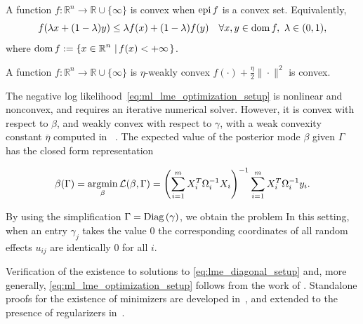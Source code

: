 \begin{definition}[Convexity]
A function $f:\mathbb{R}^n\rightarrow \mathbb{R} \cup \{\infty\}$ is convex when $\operatorname{epi} f$ is a convex set. Equivalently, 
\[
f(\lambda x + (1-\lambda)y) \leq \lambda f(x) + (1-\lambda) f(y) \quad \forall x,y\in\operatorname{\mathrm{dom}}{f},\ \lambda \in (0,1),
\]
where $\operatorname{\mathrm{dom}}{f}:=\left\{x\in{\operatorname{\mathbb{R}}^n}\,\left|\,f(x)<+\infty\right.\right\}$.
\end{definition}

\begin{definition}
A function $f:\mathbb{R}^n\rightarrow \mathbb{R} \cup \{\infty\}$ is $\eta$-weakly convex 
$f(\cdot)+\frac{\eta}{2}\|\cdot\|^2$ is convex. 
\end{definition}

The negative log likelihood~\eqref{eq:ml_lme_optimization_setup}  is nonlinear and nonconvex, and requires an iterative numerical solver.
However, it is convex with respect to $\beta$, and weakly convex with respect to $\gamma$, with a weak convexity constant $\overline \eta$
computed in~\cite[Section 5.1]{Theory1} . The expected value of the posterior mode $\beta$ given $\Gamma$ has the closed form representation 
	
\begin{equation}
	\label{eq:beta_formula}
	\beta(\Gamma) = \operatorname*{\mathrm{argmin}}_{\beta}\operatorname{\mathcal{L}}(\beta, \Gamma) = \left(\sum_{i = 1}^m X_i^T\Omega_i^{-1}X_i\right)^{-1}\sum_{i = 1}^mX_i^T\Omega_i^{-1}y_i.
\end{equation}

By using the simplification $\Gamma=\mathrm{Diag}\left(\gamma\right)$, we obtain the problem
In this setting, when an
entry $\gamma_j$ takes the  value $0$ the corresponding coordinates of all random effects $u_{ij}$ are identically $0$ for all $i$. 

Verification of the existence to solutions to \eqref{eq:lme_diagonal_setup}
and, more generally, \eqref{eq:ml_lme_optimization_setup} follows from the work of \cite{zheng2021trimmed}.
Standalone proofs for the existence of minimizers are developed in~\cite[Theorem 1]{Theory1},
and extended to the presence of regularizers in~\cite[Theorem 2]{Theory1}. %



